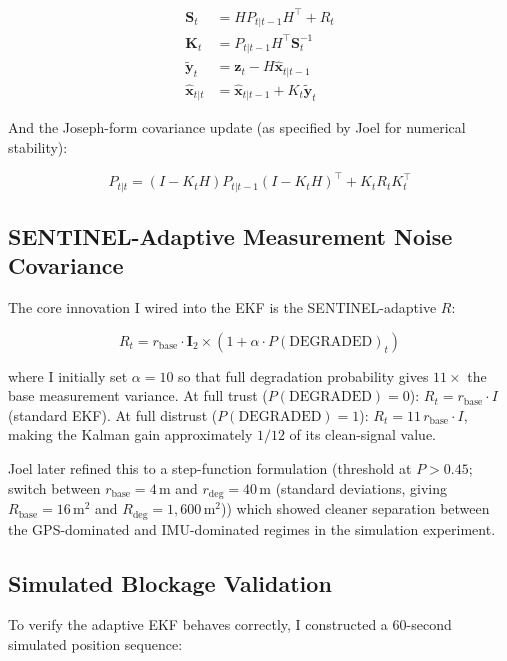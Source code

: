 \documentclass[12pt,a4paper]{article}
\begin{document}
\begin{align}
  \mathbf{S}_t   &= H P_{t|t-1} H^\top + R_t \\
  \mathbf{K}_t   &= P_{t|t-1} H^\top \mathbf{S}_t^{-1} \\
  \tilde{\mathbf{y}}_t &= \mathbf{z}_t - H\hat{\mathbf{x}}_{t|t-1} \\
  \hat{\mathbf{x}}_{t|t} &= \hat{\mathbf{x}}_{t|t-1} + K_t\tilde{\mathbf{y}}_t
\end{align}

And the Joseph-form covariance update (as specified by Joel for numerical stability):

\begin{equation}
  P_{t|t} = (I - K_t H) P_{t|t-1} (I - K_t H)^\top + K_t R_t K_t^\top
\end{equation}

\subsection{SENTINEL-Adaptive Measurement Noise Covariance}

The core innovation I wired into the EKF is the SENTINEL-adaptive $R$:

\begin{equation}
  R_t = r_\mathrm{base} \cdot \mathbf{I}_2
  \times \left(1 + \alpha \cdot P(\mathrm{DEGRADED})_t\right)
\end{equation}

where I initially set $\alpha = 10$ so that full degradation probability gives $11\times$
the base measurement variance.
At full trust ($P(\mathrm{DEGRADED}) = 0$): $R_t = r_\mathrm{base}\cdot I$ (standard EKF).
At full distrust ($P(\mathrm{DEGRADED}) = 1$): $R_t = 11\,r_\mathrm{base}\cdot I$, making
the Kalman gain approximately $1/12$ of its clean-signal value.

Joel later refined this to a step-function formulation (threshold at $P > 0.45$;
switch between $r_\mathrm{base} = 4$\,m and $r_\mathrm{deg} = 40$\,m (standard deviations,
giving $R_\mathrm{base} = 16$\,m$^2$ and $R_\mathrm{deg} = 1{,}600$\,m$^2$)) which
showed cleaner separation between the GPS-dominated and IMU-dominated regimes in the
simulation experiment.

\subsection{Simulated Blockage Validation}

To verify the adaptive EKF behaves correctly, I constructed a 60-second simulated
position sequence:
\end{document}
